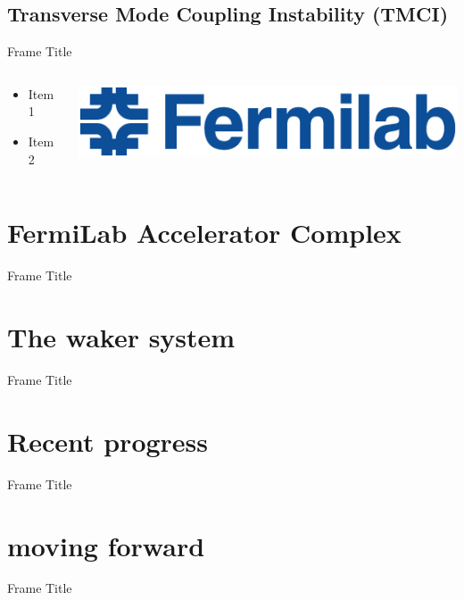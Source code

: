 \documentclass[xcolor=dvipsnames,18]{beamer}
\begin{document}
\subsection{Transverse Mode Coupling Instability (TMCI)}
\begin{frame}{Frame Title}
\begin{columns}
\begin{column}{0.45\textwidth}
\centering
\begin{itemize}
    \item Item 1
    \item Item 2
\end{itemize}
\end{column}
\begin{column}{0.45\textwidth}
\centering
\includegraphics[width=1\linewidth]{FNAL-Logo-NAL-Blue.png}\\
\end{column}
\end{columns}
\end{frame}
\section{FermiLab Accelerator Complex}
\begin{frame}{Frame Title}
\end{frame}
\section{The waker system}
\begin{frame}{Frame Title}
\end{frame}

\section{Recent progress}
\begin{frame}{Frame Title}
\end{frame}

\section{moving forward}
\begin{frame}{Frame Title}
\end{frame}
\end{document}
